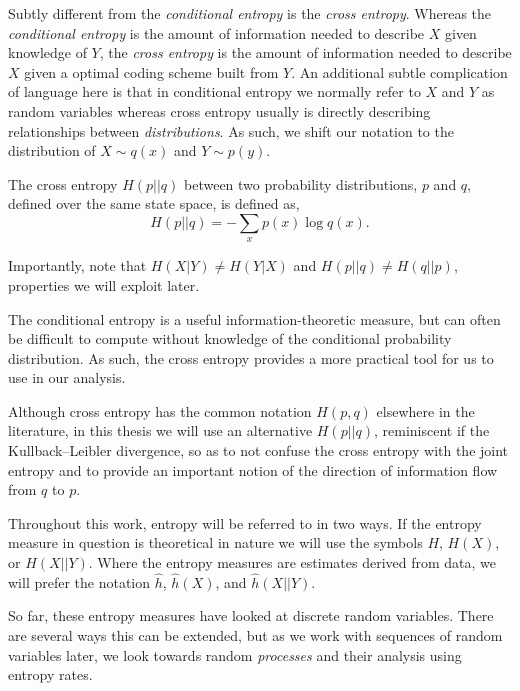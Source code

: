 Subtly different from the \emph{conditional entropy} is the \emph{cross entropy}. Whereas the \emph{conditional entropy} is the amount of information needed to describe $X$ given knowledge of $Y$, the \emph{cross entropy} is the amount of information needed to describe $X$ given a optimal coding scheme built from $Y.$ An additional subtle complication of language here is that in conditional entropy we normally refer to $X$ and $Y$ as random variables whereas cross entropy usually is directly describing relationships between \emph{distributions}. As such, we shift our notation to the distribution of $X \sim q(x)$ and $Y \sim p(y)$.

\begin{definition}\label{def:crossentropy}
	The cross entropy $H(p||q)$ between two probability distributions, $p$ and $q$, defined over the same state space, is defined as, 
	\begin{equation}
	H (p||q)= - \sum_{x} p(x) \log {q(x)}.
	\end{equation}
\end{definition}

\begin{remark}
	Importantly, note that $H(X|Y) \neq  H(Y|X)$ and $H(p||q) \neq H (q||p)$, properties we will exploit later.
\end{remark}

The conditional entropy is a useful information-theoretic measure, but can often be difficult to compute without knowledge of the conditional probability distribution. As such, the cross entropy provides a more practical tool for us to use in our analysis.

Although cross entropy has the common notation $H(p, q)$ elsewhere in the literature, in this thesis we will use an alternative $H(p||q)$, reminiscent if the Kullback–Leibler divergence, so as to not confuse the cross entropy with the joint entropy and to provide an important notion of the direction of information flow from $q$ to $p$.

Throughout this work, entropy will be referred to in two ways. If the entropy measure in question is theoretical in nature we will use the symbols $H$, $H(X)$, or $H(X||Y)$. Where the entropy measures are estimates derived from data, we will prefer the notation $\hat{h}$, $\hat{h}(X)$, and $\hat{h}(X||Y)$. 


So far, these entropy measures have looked at discrete random variables. There are several ways this can be extended, but as we work with sequences of random variables later, we look towards random \emph{processes} and their analysis using entropy rates.

